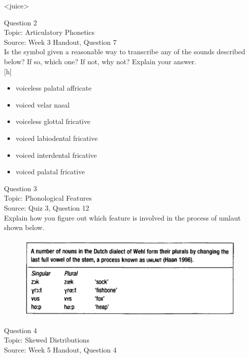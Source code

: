 \documentclass[12pt]{article}
\begin{document}
<juice>


\newpage

{\large Question 2}\\

Topic: Articulatory Phonetics\\
Source: Week 3 Handout, Question 7\\

Is the symbol given a reasonable way to transcribe any of the sounds described below? If so, which one? If not, why not? Explain your answer.\\

{[h]}

\begin{itemize} \item voiceless palatal affricate \item voiced velar nasal \item voiceless glottal fricative \item voiced labiodental fricative \item voiced interdental fricative \item voiced palatal fricative \end{itemize}


\newpage

{\large Question 3}\\

Topic: Phonological Features\\
Source: Quiz 3, Question 12\\

Explain how you figure out which feature is involved in the process of umlaut shown below.\\

\begin{figure}[H]
\includegraphics{../images/dutch.png}
\end{figure}

\newpage

{\large Question 4}\\

Topic: Skewed Distributions\\
Source: Week 5 Handout, Question 4\\
\end{document}
